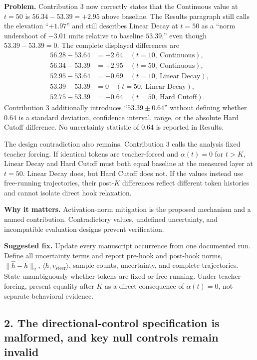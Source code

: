 \documentclass[11pt]{article}
\begin{document}
\textbf{Problem.} Contribution 3 now correctly states that the Continuous value at $t=50$ is $56.34-53.39=+2.95$ above baseline.  The Results paragraph still calls the elevation ``$+1.97$'' and still describes Linear Decay at $t=50$ as a ``norm undershoot of $-3.01$ units relative to baseline $53.39$,'' even though $53.39-53.39=0$.  The complete displayed differences are
\begin{align*}
56.28-53.64 &= +2.64 \quad (t=10,\ \text{Continuous}),\\
56.34-53.39 &= +2.95 \quad (t=50,\ \text{Continuous}),\\
52.95-53.64 &= -0.69 \quad (t=10,\ \text{Linear Decay}),\\
53.39-53.39 &= 0 \quad (t=50,\ \text{Linear Decay}),\\
52.75-53.39 &= -0.64 \quad (t=50,\ \text{Hard Cutoff}).
\end{align*}
Contribution 3 additionally introduces ``$53.39\pm0.64$'' without defining whether $0.64$ is a standard deviation, confidence interval, range, or the absolute Hard Cutoff difference.  No uncertainty statistic of 0.64 is reported in Results.

The design contradiction also remains.  Contribution 3 calls the analysis fixed teacher forcing.  If identical tokens are teacher-forced and $\alpha(t)=0$ for $t>K$, Linear Decay and Hard Cutoff must both equal baseline at the measured layer at $t=50$.  Linear Decay does, but Hard Cutoff does not.  If the values instead use free-running trajectories, their post-$K$ differences reflect different token histories and cannot isolate direct hook relaxation.

\textbf{Why it matters.} Activation-norm mitigation is the proposed mechanism and a named contribution.  Contradictory values, undefined uncertainty, and incompatible evaluation designs prevent verification.

\textbf{Suggested fix.} Update every manuscript occurrence from one documented run.  Define all uncertainty terms and report pre-hook and post-hook norms, $\|\hat h-h\|_2$, $\langle h,v_{\text{steer}}\rangle$, sample counts, uncertainty, and complete trajectories.  State unambiguously whether tokens are fixed or free-running.  Under teacher forcing, present equality after $K$ as a direct consequence of $\alpha(t)=0$, not separate behavioral evidence.

\subsection*{2. The directional-control specification is malformed, and key null controls remain invalid}
\end{document}
